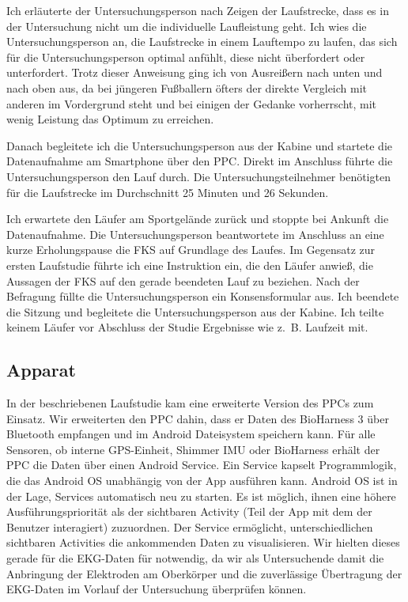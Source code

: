 Ich erläuterte der Untersuchungsperson nach Zeigen der Laufstrecke, dass es in der Untersuchung nicht um die individuelle Laufleistung geht. Ich wies die Untersuchungsperson an, die Laufstrecke in einem Lauftempo zu laufen, das sich für die Untersuchungsperson optimal anfühlt, diese nicht überfordert oder unterfordert. Trotz dieser Anweisung ging ich von Ausreißern nach unten und nach oben aus, da bei jüngeren Fußballern öfters der direkte Vergleich mit anderen im Vordergrund steht und bei einigen der Gedanke vorherrscht, mit wenig Leistung das Optimum zu erreichen. 

Danach begleitete ich die Untersuchungsperson aus der Kabine und startete die Datenaufnahme am Smartphone über den \ac{PPC}. Direkt im Anschluss führte die Untersuchungsperson den Lauf durch. Die Untersuchungsteilnehmer benötigten für die Laufstrecke im Durchschnitt 25 Minuten und 26 Sekunden. 

Ich erwartete den Läufer am Sportgelände zurück und stoppte bei Ankunft die Datenaufnahme. Die Untersuchungsperson beantwortete im Anschluss an eine kurze Erholungspause die \ac{FKS} auf Grundlage des Laufes. Im Gegensatz zur ersten Laufstudie führte ich eine Instruktion ein, die den Läufer anwieß, die Aussagen der \ac{FKS} auf den gerade beendeten Lauf zu beziehen. Nach der Befragung füllte die Untersuchungsperson ein Konsensformular aus. Ich beendete die Sitzung und begleitete die Untersuchungsperson aus der Kabine. Ich teilte keinem Läufer vor Abschluss der Studie Ergebnisse wie z.~B. Laufzeit mit. 

\subsection{Apparat} 

\label{sub:apparat}

In der beschriebenen Laufstudie kam eine erweiterte Version des \ac{PPC}s zum Einsatz. Wir erweiterten den \ac{PPC} dahin, dass er Daten des BioHarness 3 über Bluetooth empfangen und im Android Dateisystem speichern kann. Für alle Sensoren, ob interne \ac{GPS}-Einheit, Shimmer \ac{IMU} oder BioHarness erhält der \ac{PPC} die Daten über einen Android Service. Ein Service kapselt Programmlogik, die das Android OS unabhängig von der App ausführen kann. Android OS ist in der Lage, Services automatisch neu zu starten. Es ist möglich, ihnen eine höhere Ausführungspriorität als der sichtbaren Activity (Teil der App mit dem der Benutzer interagiert) zuzuordnen. Der Service ermöglicht, unterschiedlichen sichtbaren Activities die ankommenden Daten zu visualisieren. Wir hielten dieses gerade für die \ac{EKG}-Daten für notwendig, da wir als Untersuchende damit die Anbringung der Elektroden am Oberkörper und die zuverlässige Übertragung der \ac{EKG}-Daten im Vorlauf der Untersuchung überprüfen können. 

